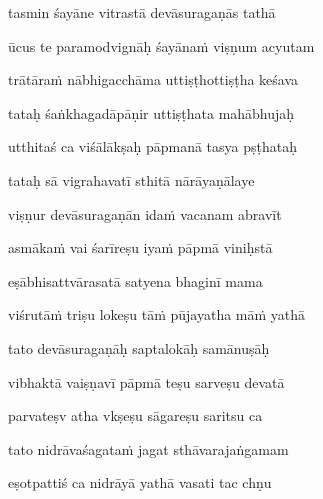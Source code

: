 tasmin śayāne vitrastā devāsuragaṇās tathā\thinspace{\dandab} \dontdisplaylinenum

ūcus te paramodvignāḥ śayānaṁ viṣṇum acyutam \veg\dontdisplaylinenum
{}

trātāraṁ nābhigacchāma uttiṣṭhottiṣṭha keśava\thinspace{\dandab} \dontdisplaylinenum

tataḥ śaṅkhagadāpāṇir uttiṣṭhata mahābhujaḥ \veg\dontdisplaylinenum

utthitaś ca viśālākṣaḥ pāpmanā tasya pṣṭhataḥ\thinspace{\dandab} \dontdisplaylinenum

tataḥ sā vigrahavatī sthitā nārāyaṇālaye \veg\dontdisplaylinenum
{}

viṣṇur devāsuragaṇān idaṁ vacanam abravīt\thinspace{\dandab} \dontdisplaylinenum

asmākaṁ vai śarīreṣu iyaṁ pāpmā viniḥstā \veg\dontdisplaylinenum
{}

eṣābhisattvārasatā satyena bhaginī mama\thinspace{\dandab} \dontdisplaylinenum

viśrutāṁ triṣu lokeṣu tāṁ pūjayatha māṁ yathā \veg\dontdisplaylinenum
{}

tato devāsuragaṇāḥ saptalokāḥ samānuṣāḥ\thinspace{\dandab} \dontdisplaylinenum

vibhaktā vaiṣṇavī pāpmā teṣu sarveṣu devatā \veg\dontdisplaylinenum
{}

parvateṣv atha vkṣeṣu sāgareṣu saritsu ca\thinspace{\dandab} \dontdisplaylinenum

tato nidrāvaśagataṁ jagat sthāvarajaṅgamam \veg\dontdisplaylinenum

eṣotpattiś ca nidrāyā yathā vasati tac chṇu\thinspace{\dandab} \dontdisplaylinenum


